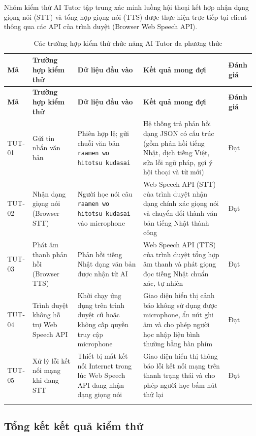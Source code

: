 \documentclass[../DoAn.tex]{subfiles}
\begin{document}
Nhóm kiểm thử AI Tutor tập trung xác minh luồng hội thoại kết hợp nhận dạng giọng nói (STT) và tổng hợp giọng nói (TTS) được thực hiện trực tiếp tại client thông qua các API của trình duyệt (Browser Web Speech API).

\begin{longtable}{|p{1.2cm}|p{2.8cm}|p{3.0cm}|p{5.0cm}|p{1.0cm}|}
\hline
\textbf{Mã} & \textbf{Trường hợp kiểm thử} & \textbf{Dữ liệu đầu vào} & \textbf{Kết quả mong đợi} & \textbf{Đánh giá} \\
\hline
\endfirsthead
\hline
\textbf{Mã} & \textbf{Trường hợp kiểm thử} & \textbf{Dữ liệu đầu vào} & \textbf{Kết quả mong đợi} & \textbf{Đánh giá} \\
\hline
\endhead
TUT-01 & Gửi tin nhắn văn bản & Phiên hợp lệ; gửi chuỗi văn bản \texttt{raamen wo hitotsu kudasai} & Hệ thống trả phản hồi dạng JSON có cấu trúc (gồm phản hồi tiếng Nhật, dịch tiếng Việt, sửa lỗi ngữ pháp, gợi ý hội thoại và từ mới) & Đạt \\
\hline
TUT-02 & Nhận dạng giọng nói (Browser STT) & Người học nói câu \texttt{raamen wo hitotsu kudasai} vào microphone & Web Speech API (STT) của trình duyệt nhận dạng chính xác giọng nói và chuyển đổi thành văn bản tiếng Nhật thành công & Đạt \\
\hline
TUT-03 & Phát âm thanh phản hồi (Browser TTS) & Phản hồi tiếng Nhật dạng văn bản được nhận từ AI & Web Speech API (TTS) của trình duyệt tổng hợp âm thanh và phát giọng đọc tiếng Nhật chuẩn xác, tự nhiên & Đạt \\
\hline
TUT-04 & Trình duyệt không hỗ trợ Web Speech API & Khởi chạy ứng dụng trên trình duyệt cũ hoặc không cấp quyền truy cập microphone & Giao diện hiển thị cảnh báo không sử dụng được microphone, ẩn nút ghi âm và cho phép người học nhập liệu bình thường bằng bàn phím & Đạt \\
\hline
TUT-05 & Xử lý lỗi kết nối mạng khi đang STT & Thiết bị mất kết nối Internet trong lúc Web Speech API đang nhận dạng giọng nói & Giao diện hiển thị thông báo lỗi kết nối mạng trên thanh trạng thái và cho phép người học bấm nút thử lại & Đạt \\
\hline
\caption{Các trường hợp kiểm thử chức năng AI Tutor đa phương thức}
\label{table:4.15}\\
\end{longtable}

\subsection{Tổng kết kết quả kiểm thử}
\label{subsection:4.4.4}
\end{document}
